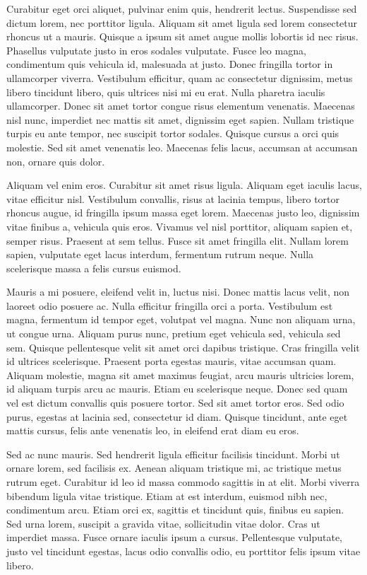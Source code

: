 Curabitur eget orci aliquet, pulvinar enim quis, hendrerit lectus. Suspendisse sed dictum lorem, nec porttitor ligula. Aliquam sit amet ligula sed lorem consectetur rhoncus ut a mauris. Quisque a ipsum sit amet augue mollis lobortis id nec risus. Phasellus vulputate justo in eros sodales vulputate. Fusce leo magna, condimentum quis vehicula id, malesuada at justo. Donec fringilla tortor in ullamcorper viverra. Vestibulum efficitur, quam ac consectetur dignissim, metus libero tincidunt libero, quis ultrices nisi mi eu erat. Nulla pharetra iaculis ullamcorper. Donec sit amet tortor congue risus elementum venenatis. Maecenas nisl nunc, imperdiet nec mattis sit amet, dignissim eget sapien. Nullam tristique turpis eu ante tempor, nec suscipit tortor sodales. Quisque cursus a orci quis molestie. Sed sit amet venenatis leo. Maecenas felis lacus, accumsan at accumsan non, ornare quis dolor.

Aliquam vel enim eros. Curabitur sit amet risus ligula. Aliquam eget iaculis lacus, vitae efficitur nisl. Vestibulum convallis, risus at lacinia tempus, libero tortor rhoncus augue, id fringilla ipsum massa eget lorem. Maecenas justo leo, dignissim vitae finibus a, vehicula quis eros. Vivamus vel nisl porttitor, aliquam sapien et, semper risus. Praesent at sem tellus. Fusce sit amet fringilla elit. Nullam lorem sapien, vulputate eget lacus interdum, fermentum rutrum neque. Nulla scelerisque massa a felis cursus euismod.

Mauris a mi posuere, eleifend velit in, luctus nisi. Donec mattis lacus velit, non laoreet odio posuere ac. Nulla efficitur fringilla orci a porta. Vestibulum est magna, fermentum id tempor eget, volutpat vel magna. Nunc non aliquam urna, ut congue urna. Aliquam purus nunc, pretium eget vehicula sed, vehicula sed sem. Quisque pellentesque velit sit amet orci dapibus tristique. Cras fringilla velit id ultrices scelerisque. Praesent porta egestas mauris, vitae accumsan quam. Aliquam molestie, magna sit amet maximus feugiat, arcu mauris ultricies lorem, id aliquam turpis arcu ac mauris. Etiam eu scelerisque neque. Donec sed quam vel est dictum convallis quis posuere tortor. Sed sit amet tortor eros. Sed odio purus, egestas at lacinia sed, consectetur id diam. Quisque tincidunt, ante eget mattis cursus, felis ante venenatis leo, in eleifend erat diam eu eros.

Sed ac nunc mauris. Sed hendrerit ligula efficitur facilisis tincidunt. Morbi ut ornare lorem, sed facilisis ex. Aenean aliquam tristique mi, ac tristique metus rutrum eget. Curabitur id leo id massa commodo sagittis in at elit. Morbi viverra bibendum ligula vitae tristique. Etiam at est interdum, euismod nibh nec, condimentum arcu. Etiam orci ex, sagittis et tincidunt quis, finibus eu sapien. Sed urna lorem, suscipit a gravida vitae, sollicitudin vitae dolor. Cras ut imperdiet massa. Fusce ornare iaculis ipsum a cursus. Pellentesque vulputate, justo vel tincidunt egestas, lacus odio convallis odio, eu porttitor felis ipsum vitae libero.

